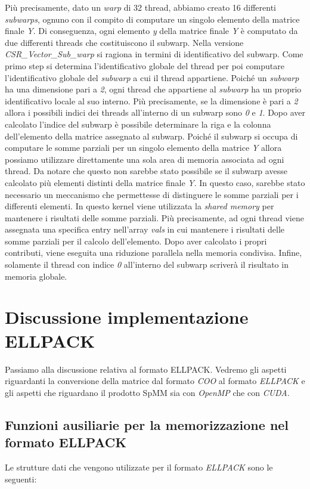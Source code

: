\documentclass{article}
\begin{document}
Più precisamente, dato un \textit{warp} di 32 thread, abbiamo creato 16 differenti \textit{subwarps}, ognuno con il compito di computare un singolo elemento della matrice finale \textit{Y}. Di conseguenza, ogni elemento \textit{y} della matrice finale \textit{Y} è computato da due differenti threads che costituiscono il subwarp. Nella versione \textit{CSR\_Vector\_Sub\_warp} si ragiona in termini di identificativo del subwarp. Come primo step si determina l'identificativo globale del thread per poi computare l'identificativo globale del \textit{subwarp} a cui il thread appartiene. Poiché un \textit{subwarp} ha una dimensione pari a \textit{2}, ogni thread che appartiene al \textit{subwarp} ha un proprio identificativo locale al suo interno. Più precisamente, se la dimensione è pari a \textit{2} allora i possibili indici dei threads all'interno di un subwarp sono \textit{0} e \textit{1}. Dopo aver calcolato l'indice del subwarp è possibile determinare la riga e la colonna dell'elemento della matrice assegnato al subwarp. Poiché il subwarp si occupa di computare le somme parziali per un singolo elemento della matrice \textit{Y} allora possiamo utilizzare direttamente una sola area di memoria associata ad ogni thread. Da notare che questo non sarebbe stato possibile se il subwarp avesse calcolato più elementi distinti della matrice finale \textit{Y}. In questo caso, sarebbe stato necessario un meccanismo che permettesse di distinguere le somme parziali per i differenti elementi. In questo kernel viene utilizzata la \textit{shared memory} per mantenere i risultati delle somme parziali. Più precisamente, ad ogni thread viene assegnata una specifica entry nell'array \textit{vals} in cui mantenere i risultati delle somme parziali per il calcolo dell'elemento. Dopo aver calcolato i propri contributi, viene eseguita una riduzione parallela nella memoria condivisa. Infine, solamente il thread con indice \textit{0} all'interno del subwarp scriverà il risultato in memoria globale.

\section{Discussione implementazione ELLPACK}
Passiamo alla discussione relativa al formato ELLPACK. Vedremo gli aspetti riguardanti la conversione della matrice dal formato \textit{COO} al formato \textit{ELLPACK} e gli aspetti che riguardano il prodotto SpMM sia con \textit{OpenMP} che con \textit{CUDA}.

\subsection{Funzioni ausiliarie per la memorizzazione nel formato ELLPACK}
Le strutture dati che vengono utilizzate per il formato \textit{ELLPACK} sono le seguenti:
\end{document}
